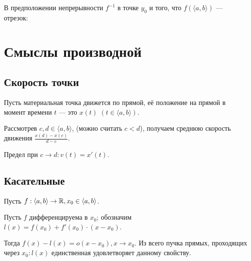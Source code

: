 \documentclass[a4paper]{report}
\begin{document}
    В предположении непрерывности $f^{-1}$ в точке $y_0$ и того, что $f(\langle a, b \rangle)$ --- отрезок:


    \section{Смыслы производной}

    \subsection{Скорость точки}
    Пусть материальная точка движется по прямой, её положение на прямой в момент времени $t$ --- это $x(t)$ $(t \in \langle a, b \rangle)$.

    Рассмотрев $c, d \in \langle a, b \rangle$, (можно считать $c < d$), получаем среднюю скорость движения $\frac{x(d) - x(c)}{d - c}$.

    Предел при $c \to d: v(t) = x'(t)$.

    \subsection{Касательные}
    Пусть $f: \langle a, b \rangle \rightarrow \mathbb{R}, x_0 \in \langle a, b \rangle$.

    Пусть $f$ дифференцируема в $x_0$; обозначим $l(x) =f(x_0) + f'(x_0)\cdot(x - x_0)$.

    Тогда $f(x) - l(x) = o(x - x_0), x \to x_0$.
    Из всего пучка прямых, проходящих через $x_0: l(x)$ единственная удовлетворяет данному свойству.
\end{document}
